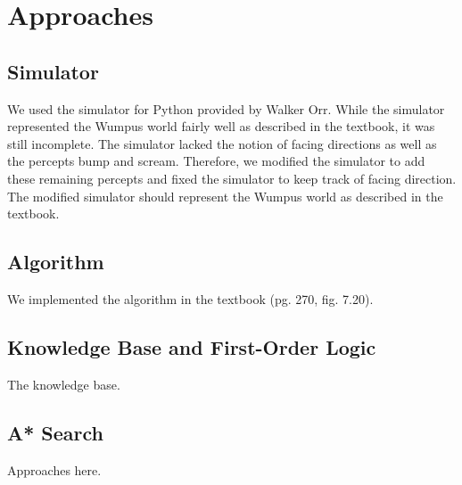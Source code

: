 \section{Approaches}\label{sec:approaches}

\subsection{Simulator}

We used the simulator for Python provided by Walker Orr. While the simulator represented the Wumpus world fairly well as described in the textbook, it was still incomplete. The simulator lacked the notion of facing directions as well as the percepts bump and scream. Therefore, we modified the simulator to add these remaining percepts and fixed the simulator to keep track of facing direction. The modified simulator should represent the Wumpus world as described in the textbook.

\subsection{Algorithm}

We implemented the algorithm in the textbook (pg. 270, fig. 7.20).

\subsection{Knowledge Base and First-Order Logic}

The knowledge base.

\subsection{A* Search}

Approaches here.


